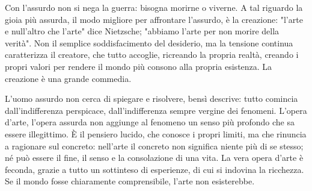 \documentclass[a4paper,12pt,oneside]{article}%
\begin{document}
Con l'assurdo non si nega la guerra: bisogna morirne o
viverne. A tal riguardo la gioia più assurda, il modo
migliore per affrontare l'assurdo, è la creazione:
"l'arte e null'altro che l'arte" dice Nietzsche;
"abbiamo l'arte per non morire della verità". Non il
semplice soddisfacimento del desiderio, ma la
tensione continua caratterizza il creatore, che tutto
accoglie, ricreando la propria realtà, creando i propri
valori per rendere il mondo più consono alla propria
esistenza. La creazione è una grande commedia.

L'uomo assurdo non cerca di spiegare e risolvere,
bensì descrive: tutto comincia dall'indifferenza
perspicace, dall'indifferenza sempre vergine dei
fenomeni. L'opera d'arte, l'opera assurda non aggiunge
al fenomeno un senso più profondo che sa essere
illegittimo. È il pensiero lucido, che conosce i propri
limiti, ma che rinuncia a ragionare sul concreto: nell'arte il concreto non significa niente più di se stesso; né può essere il fine, il senso e la consolazione di una vita. La vera opera d'arte è feconda, grazie a tutto un sottinteso di esperienze, di cui si indovina la ricchezza. Se il mondo fosse chiaramente comprensibile, l'arte non esisterebbe.
	
	
	
\end{document}
